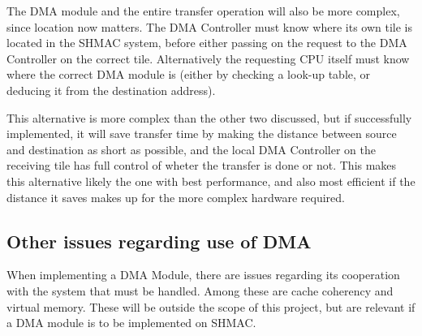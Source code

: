 The DMA module and the entire transfer operation will also be more complex, since location now matters.
The DMA Controller must know where its own tile is located in the SHMAC system, before either passing on the request to the DMA Controller on the correct tile.
Alternatively the requesting CPU itself must know where the correct DMA module is (either by checking a look-up table, or deducing it from the destination address).

This alternative is more complex than the other two discussed, but if successfully implemented, it will save transfer time by making the distance between source and destination as short as possible, and the local DMA Controller on the receiving tile has full control of wheter the transfer is done or not.
This makes this alternative likely the one with best performance, and also most efficient if the distance it saves makes up for the more complex hardware required.


\subsection{Other issues regarding use of DMA}

When implementing a DMA Module, there are issues regarding its cooperation with the system that must be handled.
Among these are cache coherency and virtual memory.
These will be outside the scope of this project, but are relevant if a DMA module is to be implemented on SHMAC.

